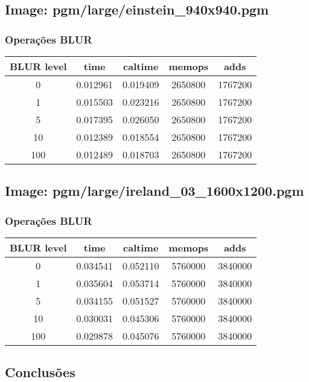 \documentclass{report}
\begin{document}
\subsection*{Image: pgm/large/einstein\_940x940.pgm}

\subsubsection*{Operações BLUR}
\begin{tabular}{ccccc}
\toprule
\textbf{BLUR level} & \textbf{time} & \textbf{caltime} & \textbf{memops} & \textbf{adds} \\
\midrule
0 & 0.012961 & 0.019409 & 2650800 & 1767200 \\
1 & 0.015503 & 0.023216 & 2650800 & 1767200 \\
5 & 0.017395 & 0.026050 & 2650800 & 1767200 \\
10 & 0.012389 & 0.018554 & 2650800 & 1767200 \\
100 & 0.012489 & 0.018703 & 2650800 & 1767200 \\
\bottomrule
\end{tabular}

\subsection*{Image: pgm/large/ireland\_03\_1600x1200.pgm}

\subsubsection*{Operações BLUR}
\begin{tabular}{ccccc}
\toprule
\textbf{BLUR level} & \textbf{time} & \textbf{caltime} & \textbf{memops} & \textbf{adds} \\
\midrule
0 & 0.034541 & 0.052110 & 5760000 & 3840000 \\
1 & 0.035604 & 0.053714 & 5760000 & 3840000 \\
5 & 0.034155 & 0.051527 & 5760000 & 3840000 \\
10 & 0.030031 & 0.045306 & 5760000 & 3840000 \\
100 & 0.029878 & 0.045076 & 5760000 & 3840000 \\
\bottomrule
\end{tabular}

\subsection{Conclusões}
\end{document}
